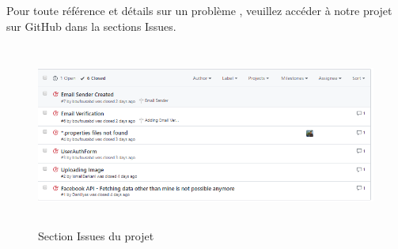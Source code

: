 \documentclass[a4paper]{report}
\begin{document}
\begin{spacing}{2}
\par
Pour toute référence et détails sur un problème , veuillez accéder à notre projet sur GitHub dans la sections Issues. 
\cleardoublepage
\begin{figure}[!ht]
\begin{center}
\includegraphics[height=6cm]{issues.png}
\end{center}
\caption[Section Issues du projet]{Section Issues du projet\protect\footnotemark}
\end{figure}

\end{spacing}
\end{document}
